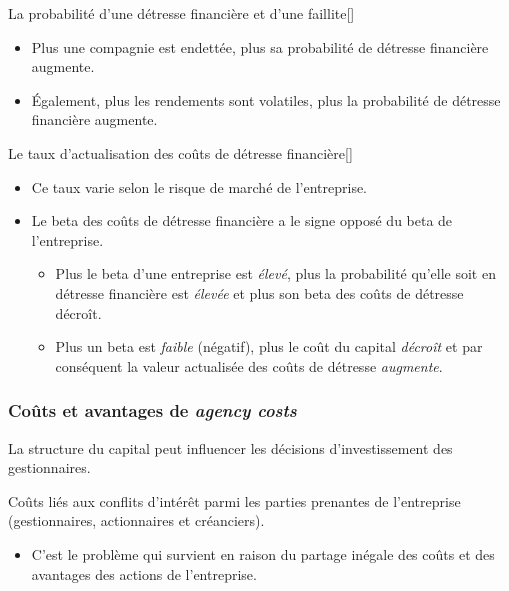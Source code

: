 \documentclass[10pt, french]{article}
\begin{document}
\begin{multicols*}{2}
\begin{definitionGENERAL}{La probabilité d'une détresse financière et d'une faillite}[]
\begin{itemize}
	\item	Plus une compagnie est endettée, plus sa probabilité de détresse financière augmente.
	\item	Également, plus les rendements sont volatiles, plus la probabilité de détresse financière augmente.
\end{itemize}
\end{definitionGENERAL}

\begin{definitionGENERAL}{Le taux d'actualisation des coûts de détresse financière}[]
\begin{itemize}
	\item	Ce taux varie selon le risque de marché de l'entreprise.
	\item	Le beta des coûts de détresse financière a le signe opposé du beta de l'entreprise.
		\begin{itemize}
		\item	Plus le beta d'une entreprise est \textit{élevé}, plus la probabilité qu'elle soit en détresse financière est \textit{élevée} et plus son beta des coûts de détresse décroît.
		\item	Plus un beta est \textit{faible} (négatif), plus le coût du capital \textit{décroît} et par conséquent la valeur actualisée des coûts de détresse \textit{augmente}.
		\end{itemize}
\end{itemize}
\end{definitionGENERAL}


\columnbreak
\subsubsection{Coûts et avantages de \og \textit{agency costs} \fg{}}
La structure du capital peut influencer les décisions d'investissement des gestionnaires. 
\begin{definitionNOHFILL}
Coûts liés aux conflits d'intérêt parmi les parties prenantes de l'entreprise (gestionnaires, actionnaires et créanciers). 
\begin{itemize}
	\item	C'est le problème qui survient en raison du partage inégale des coûts et des avantages des actions de l'entreprise.
\end{itemize}
\end{definitionNOHFILL}


\end{multicols*}
\end{document}
